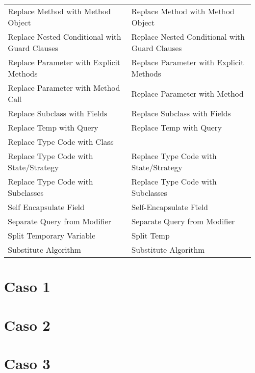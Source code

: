 \documentclass[11pt,a4paper,oneside]{book}
\begin{document}
\begin{longtable}{|p{200pt}|p{200pt}|}
    Replace Method with Method Object & Replace Method with Method Object\\ 
    Replace Nested Conditional with Guard Clauses & Replace Nested Conditional with Guard Clauses\\ 
    Replace Parameter with Explicit Methods & Replace Parameter with Explicit Methods\\ 
    Replace Parameter with Method Call & Replace Parameter with Method\\ 
    Replace Subclass with Fields & Replace Subclass with Fields\\ 
    Replace Temp with Query & Replace Temp with Query\\ 
    Replace Type Code with Class & \\ 
    Replace Type Code with State/Strategy & Replace Type Code with State/Strategy\\ 
    Replace Type Code with Subclasses & Replace Type Code with Subclasses\\ 
    Self Encapsulate Field & Self-Encapsulate Field\\ 
    Separate Query from Modifier & Separate Query from Modifier\\ 
    Split Temporary Variable & Split Temp\\ 
    Substitute Algorithm &     Substitute Algorithm\\
\end{longtable}





\chapter{Caso 1}


\chapter{Caso 2}


\chapter {Caso 3}
\end{document}
